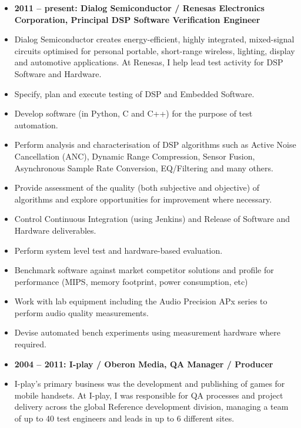\documentclass[a4paper,10pt]{article}
\begin{document}
\begin{itemize}[align=left]
\item[] \textbf{2011 – present: Dialog Semiconductor / Renesas Electronics
  Corporation, Principal DSP Software Verification Engineer}
\item[] Dialog Semiconductor creates energy-efficient, highly integrated,
  mixed-signal circuits optimised for personal portable, short-range wireless,
    lighting, display and automotive applications. At Renesas, I help lead
    test activity for DSP Software and Hardware.
\\
\end{itemize}

\begin{itemize}[label=\FilledSmallSquare, leftmargin=50pt]
\item Specify, plan and execute testing of DSP and Embedded Software.
\item Develop software (in Python, C and C++) for the purpose of test automation.
\item Perform analysis and characterisation of DSP algorithms such as Active Noise Cancellation (ANC), Dynamic Range Compression, Sensor Fusion, Asynchronous Sample Rate Conversion, EQ/Filtering and many others.
\item Provide assessment of the quality (both subjective and objective) of algorithms and explore opportunities for improvement where necessary.
\item Control Continuous Integration (using Jenkins) and Release of Software and Hardware deliverables.
\item Perform system level test and hardware-based evaluation.
\item Benchmark software against market competitor solutions and profile for performance (MIPS, memory footprint, power consumption, etc)
\item Work with lab equipment including the Audio Precision APx series to perform audio quality measurements.
\item Devise automated bench experiments using measurement hardware where required.
\\
\end{itemize}

\begin{itemize}[align=left]
\item[] \textbf{2004 – 2011: I-play / Oberon Media, QA Manager / Producer}
\item[] I-play’s primary business was the development and publishing of games
  for mobile handsets. At I-play, I was responsible for QA processes and
    project delivery across the global Reference development division, managing
    a team of up to 40 test engineers and leads in up to 6 different sites.
\\
\end{itemize}
\end{document}
